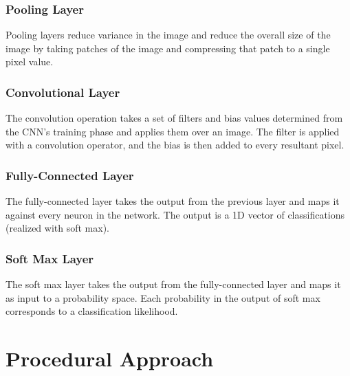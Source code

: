 \documentclass[11pt,english]{article}
\begin{document}


\subsubsection{Pooling Layer}

Pooling layers reduce variance in the image and reduce the overall size of the image by taking patches of the image and compressing that patch to a single pixel value.



\subsubsection{Convolutional Layer}

The convolution operation takes a set of filters and bias values determined from the CNN's training phase and applies them over an image.  The filter is applied with a convolution operator, and the bias is then added to every resultant pixel.



\subsubsection{Fully-Connected Layer}

The fully-connected layer takes the output from the previous layer and maps it against every neuron in the network.  The output is a 1D vector of classifications (realized with soft max).



\subsubsection{Soft Max Layer}

The soft max layer takes the output from the fully-connected layer and maps it as input to a probability space.  Each probability in the output of soft max corresponds to a classification likelihood.



\section{Procedural Approach}
\end{document}
